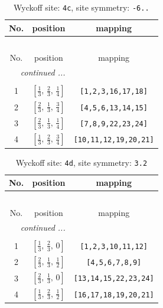 \documentclass[fleqn,8pt]{jsarticle}
\begin{document}
\renewcommand{\arraystretch}{1.2}
\begin{longtable}{ccc}
\caption{Wyckoff site: {\tt 4c}, site symmetry: {\tt -6..}}
 \\
 \hline \hline
No. & position & mapping \\ \hline \endfirsthead

\multicolumn{2}{l}{\tablename\ \thetable{}} \\
 \hline \hline
No. & position & mapping \\ \hline \endhead

 \hline \hline
\multicolumn{2}{r}{\footnotesize\it continued ...} \\ \endfoot

 \hline \hline
\multicolumn{2}{r}{} \\ \endlastfoot

1 & $\left[ \frac{1}{3},\, \frac{2}{3},\, \frac{1}{4} \right]$ & {\tt [1,2,3,16,17,18]} \\ \hline
2 & $\left[ \frac{2}{3},\, \frac{1}{3},\, \frac{3}{4} \right]$ & {\tt [4,5,6,13,14,15]} \\ \hline
3 & $\left[ \frac{2}{3},\, \frac{1}{3},\, \frac{1}{4} \right]$ & {\tt [7,8,9,22,23,24]} \\ \hline
4 & $\left[ \frac{1}{3},\, \frac{2}{3},\, \frac{3}{4} \right]$ & {\tt [10,11,12,19,20,21]} \\
\end{longtable}
\renewcommand{\arraystretch}{1.2}
\begin{longtable}{ccc}
\caption{Wyckoff site: {\tt 4d}, site symmetry: {\tt 3.2}}
 \\
 \hline \hline
No. & position & mapping \\ \hline \endfirsthead

\multicolumn{2}{l}{\tablename\ \thetable{}} \\
 \hline \hline
No. & position & mapping \\ \hline \endhead

 \hline \hline
\multicolumn{2}{r}{\footnotesize\it continued ...} \\ \endfoot

 \hline \hline
\multicolumn{2}{r}{} \\ \endlastfoot

1 & $\left[ \frac{1}{3},\, \frac{2}{3},\, 0 \right]$ & {\tt [1,2,3,10,11,12]} \\ \hline
2 & $\left[ \frac{2}{3},\, \frac{1}{3},\, \frac{1}{2} \right]$ & {\tt [4,5,6,7,8,9]} \\ \hline
3 & $\left[ \frac{2}{3},\, \frac{1}{3},\, 0 \right]$ & {\tt [13,14,15,22,23,24]} \\ \hline
4 & $\left[ \frac{1}{3},\, \frac{2}{3},\, \frac{1}{2} \right]$ & {\tt [16,17,18,19,20,21]} \\
\end{longtable}
\end{document}
